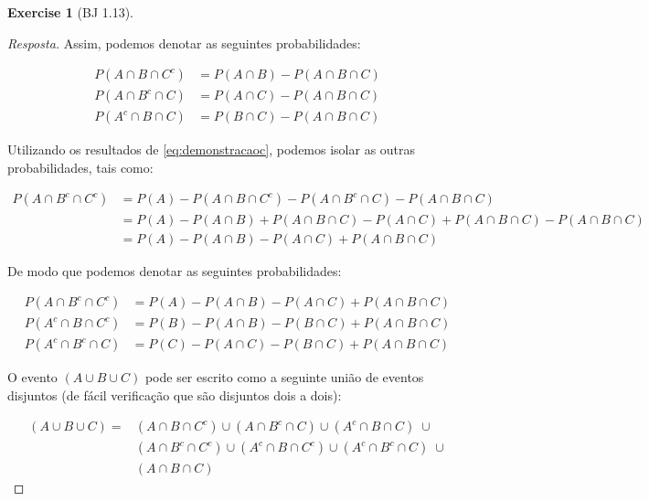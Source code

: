 \documentclass[
]{article}
\theoremstyle{definition}
\theoremstyle{definition}
\theoremstyle{definition}
\newtheorem{exercise}{Exercise}[section]
\theoremstyle{definition}
\theoremstyle{remark}
\begin{document}
\begin{exercise}[BJ 1.13]
\begin{proof}[Resposta]
Assim, podemos denotar as seguintes probabilidades:

\begin{equation}
\begin{split}
P(A \cap B \cap C^{c}) &= P(A \cap B) - P(A \cap B \cap C) \\
P(A \cap B^{c} \cap C) &= P(A \cap C) - P(A \cap B \cap C) \\
P(A^{c} \cap B \cap C) &= P(B \cap C) - P(A \cap B \cap C)
\label{eq:demonstracaoc}
\end{split}
\end{equation}

Utilizando os resultados de \eqref{eq:demonstracaoc}, podemos isolar as outras probabilidades, tais como:

\begin{align*}
P(A \cap B^{c} \cap C^{c}) &= P(A) - P(A \cap B \cap C^{c}) - P(A \cap B^{c} \cap C) - P(A \cap B \cap C) \\
&= P(A) - P(A \cap B) + P(A \cap B \cap C) - P(A \cap C) + P(A \cap B \cap C) - P(A \cap B \cap C) \\
&= P(A) - P(A \cap B) - P(A \cap C) + P(A \cap B \cap C)
\end{align*}

De modo que podemos denotar as seguintes probabilidades:

\begin{equation}
\begin{split}
P(A \cap B^{c} \cap C^{c}) &= P(A) - P(A \cap B) - P(A \cap C) + P(A \cap B \cap C) \\
P(A^{c} \cap B \cap C^{c}) &= P(B) - P(A \cap B) - P(B \cap C) + P(A \cap B \cap C) \\
P(A^{c} \cap B^{c} \cap C) &= P(C) - P(A \cap C) - P(B \cap C) + P(A \cap B \cap C)
\label{eq:demonstracaod}
\end{split}
\end{equation}

O evento \((A \cup B \cup C)\) pode ser escrito como a seguinte união de eventos disjuntos (de fácil verificação que são disjuntos dois a dois):

\begin{equation}
\begin{split}
(A \cup B \cup C) = &(A \cap B \cap C^{c}) \cup (A \cap B^{c} \cap C) \cup (A^{c} \cap B \cap C) \; \cup \\
&(A \cap B^{c} \cap C^{c}) \cup (A^{c} \cap B \cap C^{c}) \cup (A^{c} \cap B^{c} \cap C) \; \cup \\
&(A \cap B \cap C)
\label{eq:eqfinala}
\end{split}
\end{equation}


\end{proof}
\end{exercise}
\end{document}
